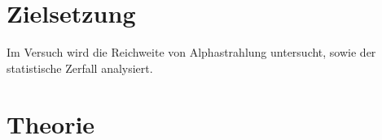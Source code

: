 \section{Zielsetzung}
Im Versuch wird die Reichweite von Alphastrahlung untersucht, sowie der statistische Zerfall analysiert.

\section{Theorie}
